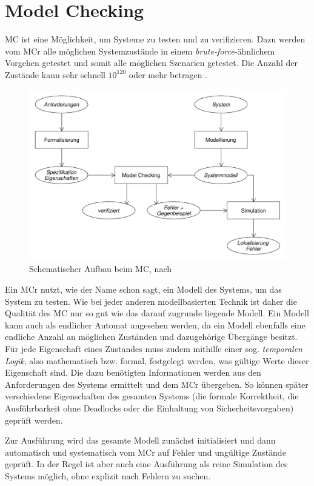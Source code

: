 \section{Model Checking}\label{sec:modelchecking}

\ac{MC} ist eine Möglichkeit, um Systeme zu testen und zu verifizieren. Dazu werden vom \ac{MCr} alle möglichen Systemzustände in einem \emph{brute-force}-ähnlichem Vorgehen getestet und somit alle möglichen Szenarien getestet. Die Anzahl der Zustände kann sehr schnell $ 10^{120} $ oder mehr betragen \cite{Grumberg1999,Baier2008}.

\begin{figure}
	\centering
	\includegraphics[width=.8\columnwidth]{./images/mcSchema.pdf}
	\caption[Schematischer Aufbau beim MC]{Schematischer Aufbau beim MC, nach \cite{Baier2008}}
	\label{fig:mcSchema}
\end{figure}

Ein \ac{MCr} nutzt, wie der Name schon sagt, ein Modell des Systems, um das System zu testen. Wie bei jeder anderen modellbasierten Technik ist daher die Qualität des \ac{MC} nur so gut wie das darauf zugrunde liegende Modell. Ein Modell kann auch als endlicher Automat angesehen werden, da ein Modell ebenfalls eine endliche Anzahl an möglichen Zuständen und dazugehörige Übergänge besitzt. Für jede Eigenschaft eines Zustandes muss zudem mithilfe einer sog. \emph{temporalen Logik}, also mathematisch bzw. formal, festgelegt werden, was gültige Werte dieser Eigenschaft sind. Die dazu benötigten Informationen werden aus den Anforderungen des Systems ermittelt und dem \ac{MCr} übergeben. So können später verschiedene Eigenschaften des gesamten Systems (\zB die formale Korrektheit, die Ausführbarkeit ohne Deadlocks oder die Einhaltung von Sicherheitsvorgaben) geprüft werden.

Zur Ausführung wird das gesamte Modell zunächst initialisiert und dann automatisch und systematisch vom \ac{MCr} auf Fehler und ungültige Zustände geprüft. In der Regel ist aber auch eine Ausführung als reine Simulation des Systems möglich, ohne explizit nach Fehlern zu suchen.

